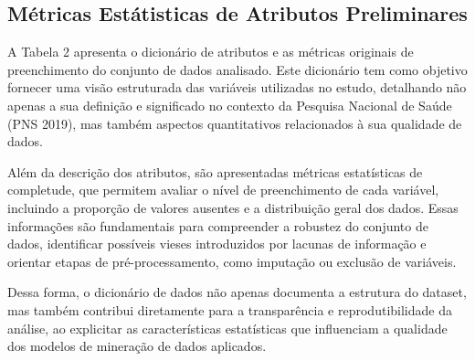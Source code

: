 \documentclass[12pt, a4paper]{article}
\begin{document}
\begin{table}[h]
    \centering
    \caption{Resumo das Dimensões e Atributos Iniciais do Estudo}
    \label{tab:atributos}
    \end{table}


    \vspace{0.5cm}
        
    \subsection{Métricas Estátisticas de Atributos Preliminares}
    
    A Tabela 2 apresenta o dicionário de atributos e as métricas originais de preenchimento do conjunto de dados analisado. Este dicionário tem como objetivo fornecer uma visão estruturada das variáveis utilizadas no estudo, detalhando não apenas a sua definição e significado no contexto da Pesquisa Nacional de Saúde (PNS 2019), mas também aspectos quantitativos relacionados à sua qualidade de dados.
    
    Além da descrição dos atributos, são apresentadas métricas estatísticas de completude, que permitem avaliar o nível de preenchimento de cada variável, incluindo a proporção de valores ausentes e a distribuição geral dos dados. Essas informações são fundamentais para compreender a robustez do conjunto de dados, identificar possíveis vieses introduzidos por lacunas de informação e orientar etapas de pré-processamento, como imputação ou exclusão de variáveis.
    
    Dessa forma, o dicionário de dados não apenas documenta a estrutura do dataset, mas também contribui diretamente para a transparência e reprodutibilidade da análise, ao explicitar as características estatísticas que influenciam a qualidade dos modelos de mineração de dados aplicados.
    
\end{document}
